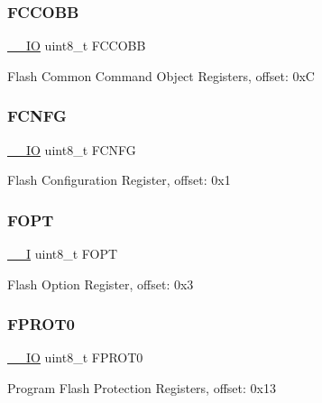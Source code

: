 \subsubsection{\texorpdfstring{FCCOBB}{FCCOBB}}
{\footnotesize\ttfamily \mbox{\hyperlink{core__cm0plus_8h_aec43007d9998a0a0e01faede4133d6be}{\+\_\+\+\_\+\+IO}} uint8\+\_\+t F\+C\+C\+O\+BB}

Flash Common Command Object Registers, offset\+: 0xC \mbox{\label{struct_f_t_f_a___type_a06f204f3d6e31fa8b5c3af07bc098278}} 
\subsubsection{\texorpdfstring{FCNFG}{FCNFG}}
{\footnotesize\ttfamily \mbox{\hyperlink{core__cm0plus_8h_aec43007d9998a0a0e01faede4133d6be}{\+\_\+\+\_\+\+IO}} uint8\+\_\+t F\+C\+N\+FG}

Flash Configuration Register, offset\+: 0x1 \mbox{\label{struct_f_t_f_a___type_a4a588e9f6d971bfa0ec727d08935c72e}} 
\subsubsection{\texorpdfstring{FOPT}{FOPT}}
{\footnotesize\ttfamily \mbox{\hyperlink{core__cm0plus_8h_af63697ed9952cc71e1225efe205f6cd3}{\+\_\+\+\_\+I}} uint8\+\_\+t F\+O\+PT}

Flash Option Register, offset\+: 0x3 \mbox{\label{struct_f_t_f_a___type_a85880705c28fcc199112e1ed40773677}} 
\subsubsection{\texorpdfstring{FPROT0}{FPROT0}}
{\footnotesize\ttfamily \mbox{\hyperlink{core__cm0plus_8h_aec43007d9998a0a0e01faede4133d6be}{\+\_\+\+\_\+\+IO}} uint8\+\_\+t F\+P\+R\+O\+T0}

Program Flash Protection Registers, offset\+: 0x13 \mbox{\label{struct_f_t_f_a___type_a76768ab2e99c7ff366200d94db19eeea}} 
